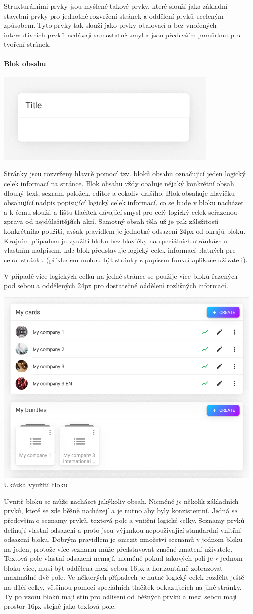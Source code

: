 		Strukturálními prvky jsou myšlené takové prvky, které slouží jako základní stavební prvky pro jednotné
		rozvržení stránek a oddělení prvků uceleným způsobem.
		Tyto prvky tak slouží jako prvky obalovací a bez vnořených interaktivních prvků nedávají samostatně smyl
		a jsou především pomůckou pro tvoření stránek.

			\paragraph{Blok obsahu}

			\includegraphics[width=0.24\linewidth]{obrazky/blok_obsahu.png}\hfill

			Stránky jsou rozvrženy hlavně pomocí tzv. bloků obsahu označující jeden logický celek informací
			na stránce.
			Blok obsahu vždy obaluje nějaký konkrétní obsah: dlouhý text, seznam položek, editor a cokoliv dalšího.
			Blok obsahuje hlavičku obsahující nadpis popisující logický celek informací, co se bude v bloku nacházet
			a k čemu slouží, a lištu tlačítek dávající smysl pro celý logický celek seřazenou zprava od nejdůležitějších
			akcí.
			Samotný obsah těla už je pak záležitostí konkrétního použití, avšak pravidlem je jednotné odsazení 24px od
			okrajů bloku.
			Krajním případem je využití bloku bez hlavičky na speciálních stránkách s vlastním nadpisem, kde blok
			představuje logický celek informací platných pro celou stránku (příkladem mohou být stránky s popisem
			funkcí aplikace uživateli).

			V případě více logických celků na jedné stránce se použije více bloků řazených pod sebou a oddělených 24px
			pro dostatečné oddělení rozlišných informací.

			\includegraphics[width=0.24\linewidth]{obrazky/blok_obsahu_ukazka.png}\hfill
			Ukázka využití bloku %

			Uvnitř bloku se může nacházet jakýkoliv obsah.
			Nicméně je několik základních prvků, které se zde běžně nacházejí a je nutno aby byly konzistentní.
			Jedná se především o seznamy prvků, textová pole a vnitřní logické celky.
			Seznamy prvků definují vlastní odsazení a proto jsou výjimkou nepoužívající standardní vnitřní odsazení
			bloku.
			Dobrým pravidlem je omezit množství seznamů v jednom bloku na jeden, protože více seznamů může představovat
			značné zmatení uživatele.
			Textová pole vlastní odsazení nemají, nicméně pokud takových polí je v jednom bloku více, musí být oddělena
			mezi sebou 16px a horizontálně zobrazovat maximálně dvě pole.
			Ve některých případech je nutné logický celek rozdělit ještě na dílčí celky, většinou pomocí speciálních
			tlačítek odkazujících na jiné stránky.
			Ty po vzoru bloků mají stín pro odlišení od běžných prvků a mezi sebou mají prostor 16px stejně jako
			textová pole.

